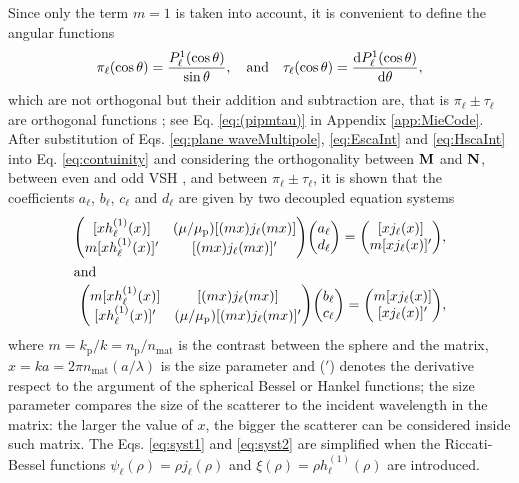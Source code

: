Since only the term $m=1$ is taken into account, it is convenient to define the angular functions
%
\begin{align}
 \pi_\ell(\cos\theta )  = \frac{P_\ell^1(\cos\theta)}{\sin\theta},\qqtext{and}
 \tau_\ell(\cos\theta) = \dv{P_\ell^1(\cos\theta)}{\theta},
 \label{eq:PiTau}
\end{align}
%
which are not orthogonal but their addition and subtraction are, that is $\pi_\ell \pm \tau_\ell$ are orthogonal functions \cite{bohren_absorption_1983}; see Eq. \eqref{eq:(pipmtau)} in Appendix \ref{app:MieCode}. After substitution  of Eqs. \eqref{eq:plane waveMultipole}, \eqref{eq:EscaInt} and \eqref{eq:HscaInt} into Eq. \eqref{eq:contuinity} and considering the orthogonality between $\vb{M}$ and $\vb{N}$,  between even and odd VSH , and between $\pi_\ell \pm \tau_\ell$, it is shown that the coefficients $a_\ell$, $b_\ell$, $c_\ell$ and $d_\ell$ are given by two decoupled equation systems
%
\begin{align}
\mqty([x h_\ell^{(1)}(x)]  & (\mu/\mu_\text{p}) [(mx) j_\ell(mx)] \\
		m[x h_\ell^{(1)}(x)]' & [(mx) j_\ell(mx)]')
		\mqty(a_\ell \\ d_\ell) = \mqty([xj_\ell(x)] \\ m[x j_\ell(x)]') ,
	\label{eq:syst1}
		\\
\intertext{and}
\mqty( m[xh_\ell^{(1)}(x)]  &  [(mx)j_\ell(mx)] \\
		[x h_\ell^{(1)}(x)]' & (\mu/\mu_\text{p})[(mx) j_\ell(mx)]' )
		\mqty(b_\ell \\ c_\ell) = \mqty(m[xj_\ell(x)] \\ [x j_\ell(x)]'),
	\label{eq:syst2}
\end{align}
%
where $m = k_\text{p} / k = n_\text{p} / n_\text{mat}$ is the contrast between the sphere and the matrix, $x= ka = 2\pi n_\text{mat} (a/\lambda)$ is the size parameter and  ($'$) denotes the derivative respect to the argument of the spherical Bessel or Hankel functions; the size parameter compares the size of the scatterer to the incident wavelength in the matrix: the larger the value of $x$, the bigger the scatterer can be considered inside such matrix. The Eqs. \eqref{eq:syst1} and \eqref{eq:syst2} are simplified when the Riccati-Bessel functions $\psi_\ell( \rho) = \rho j_\ell(\rho)$ and $\xi(\rho) = \rho h_\ell^{(1)}(\rho)$ are introduced.

